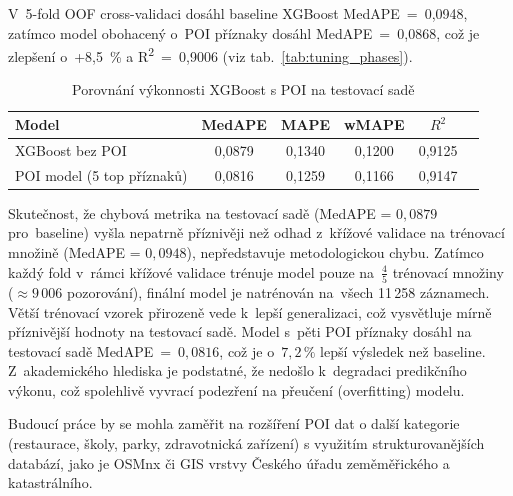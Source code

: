 V~5-fold OOF cross-validaci dosáhl baseline XGBoost MedAPE~=~0{,}0948, zatímco model obohacený o~POI příznaky dosáhl MedAPE~=~0{,}0868, což je zlepšení o~+8{,}5~\% a R\textsuperscript{2}~=~0{,}9006 (viz tab.~\ref{tab:tuning_phases}).

\begin{table}[htbp]
\centering
\caption{Porovnání výkonnosti XGBoost s POI na testovací sadě}
\label{tab:model_performance}
\begin{tabular}{lccccc}
\hline
Model & MedAPE & MAPE & wMAPE & $R^2$ \\
\hline
XGBoost bez POI & 0{,}0879 & 0{,}1340 & 0{,}1200  & 0{,}9125 \\
POI model (5 top příznaků) & 0{,}0816 & 0{,}1259 & 0{,}1166  & 0{,}9147 \\
\hline
\end{tabular}
\end{table}

Skutečnost, že chybová metrika na testovací sadě (MedAPE = $0{,}0879$ pro~baseline) vyšla nepatrně příznivěji než odhad z~křížové validace na trénovací množině (MedAPE = $0{,}0948$), nepředstavuje metodologickou chybu. Zatímco každý fold v~rámci křížové validace trénuje model pouze na~$\frac{4}{5}$ trénovací množiny ($\approx 9\,006$ pozorování), finální model je natrénován na~všech 11\,258 záznamech. Větší trénovací vzorek přirozeně vede k~lepší generalizaci, což vysvětluje mírně příznivější hodnoty na testovací sadě. Model s~pěti POI příznaky dosáhl na testovací sadě MedAPE~=~$0{,}0816$, což je o~$7{,}2\,\%$ lepší výsledek než baseline. Z~akademického hlediska je podstatné, že nedošlo k~degradaci predikčního výkonu, což spolehlivě vyvrací podezření na přeučení (overfitting) modelu.

Budoucí práce by se mohla zaměřit na rozšíření POI dat o další kategorie 
(restaurace, školy, parky, zdravotnická zařízení) s využitím 
strukturovanějších databází, jako je OSMnx či GIS vrstvy Českého 
úřadu zeměměřického a katastrálního.

